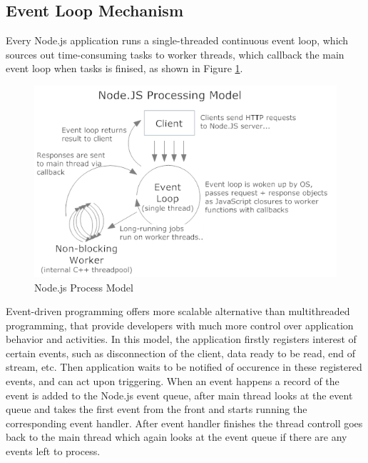 \subsection{Event Loop Mechanism} %
\label{sub:event_loop_mechanism}
Every Node.js application runs a single-threaded continuous event loop, which sources out time-consuming tasks to worker threads, which callback the main event loop when tasks is finised, as shown in Figure \ref{fig:node_js_model}.
\begin{figure}[H]
\begin{center}
\captionsetup{font=small}
\includegraphics[scale=0.8]{pics/node_js_model.png}
\caption{Node.js Process Model\cite{node_js_pic}}
\label{fig:node_js_model}
\end{center}
\end{figure}
Event-driven programming offers more scalable alternative than multithreaded programming, that provide developers with much more control over application behavior and activities. In this model, the application firstly registers interest of certain events, such as disconnection of the client, data ready to be read, end of stream, etc. Then application waits to be notified of occurence in these registered events, and can act upon triggering. \cite{7073454} When an event happens a record of the event is added to the Node.js event queue, after main thread looks at the event queue and takes the first event from the front and starts running the corresponding event handler. After event handler finishes the thread controll goes back to the main thread which again looks at the event queue if there are any events left to process.\cite{5617064}
